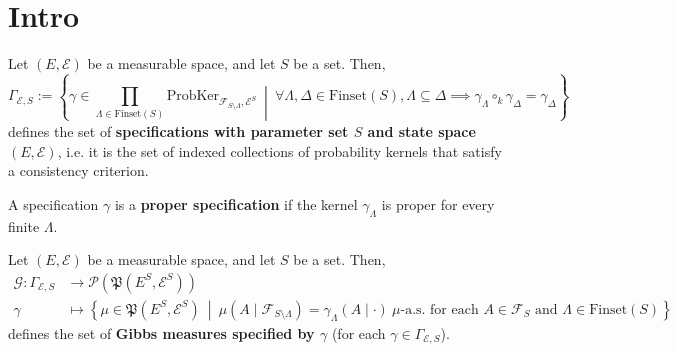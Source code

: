\chapter{Intro}

\begin{definition}[Specification]
    \label{def:specification}
    \leanok

    Let $(E, \mathcal{E})$ be a measurable space, and let $S$ be a set. Then,
    \begin{equation*}
        \Gamma_{\mathcal{E}, S}:=\left\{\gamma\in\prod_{\Lambda\in\text{Finset}(S)}\text{ProbKer}_{\mathcal{F}_{S\setminus\Lambda}, \mathcal{E}^S}~\middle\vert~ \forall \Lambda, \Delta\in\text{Finset}(S), \Lambda\subseteq\Delta\implies\gamma_\Lambda\circ_k\gamma_\Delta=\gamma_\Delta\right\}
    \end{equation*}
    defines the set of \textbf{specifications with parameter set $S$ and state space $(E, \mathcal{E})$}, i.e. it is the set of indexed collections of probability kernels that satisfy a consistency criterion.
\end{definition}

\begin{definition}
    \label{def:proper-specification}
    A specification $\gamma$ is a {\bf proper specification} if the kernel $\gamma_\Lambda$ is proper for every finite $\Lambda$.
\end{definition}

\begin{definition}
    \label{def:gibbs-measure}
    \leanok

    Let $(E, \mathcal{E})$ be a measurable space, and let $S$ be a set. Then,
    \begin{align*}
        \mathcal{G}:\Gamma_{\mathcal{E}, S}&\to\mathcal{P}(\mathfrak{P}(E^S, \mathcal{E}^S))\\
        \gamma&\mapsto\left\{\mu\in\mathfrak{P}(E^S, \mathcal{E}^S)~\middle\vert~\mu(A\mid\mathcal{F}_{S\setminus\Lambda})=\gamma_\Lambda(A\mid\cdot)~\mu\text{-a.s. for each } A\in\mathcal{F}_S\text{ and }\Lambda\in\text{Finset}(S)\right\}
    \end{align*}
    defines the set of \textbf{Gibbs measures specified by $\gamma$} (for each $\gamma\in\Gamma_{\mathcal{E}, S}$).
\end{definition}

